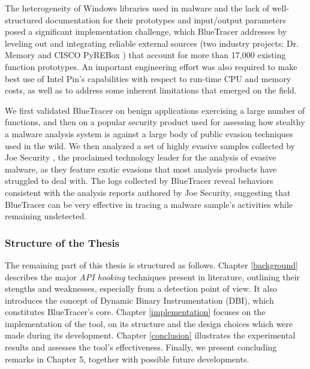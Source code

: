 The heterogeneity of Windows libraries used in malware and the lack of well-structured documentation for their prototypes and input/output parameters posed a significant implementation challenge, which BlueTracer addresses by leveling out and integrating reliable external sources (two industry projects: Dr. Memory \cite{DrMemory} and CISCO PyREBox \cite{Pyrebox}) that account for more than 17,000 existing function prototypes. An important engineering effort was also required to make best use of Intel Pin’s capabilities with respect to run-time CPU and memory costs, as well as to address some inherent limitations that emerged on the field.

We first validated BlueTracer on benign applications exercising a large number of functions, and then on a popular security product used for assessing how stealthy a malware analysis system is against a large body of public evasion techniques used in the wild. We then analyzed a set of highly evasive samples collected by Joe Security \cite{JoeBox}, the proclaimed technology leader for the analysis of evasive malware, as they feature exotic evasions that most analysis products have struggled to deal with. The logs collected by BlueTracer reveal behaviors consistent with the analysis reports authored by Joe Security, suggesting that BlueTracer can be very effective in tracing a malware sample’s activities while remaining undetected. 
\iffalse
I then analyzed a set of highly evasive samples collected by Joe Security, the proclaimed technology leader for the analysis of evasive malware, as they feature exotic evasions that most analysis products have struggled to deal with. The logs collected by BlueTracer reveal behaviors consistent with the analysis reports authored by Joe Security, suggesting that BlueTracer can be very effective in tracing a malware sample's activities while remaining undetected. 
\fi               

\subsubsection{Structure of the Thesis}
The remaining part of this thesis is structured as follows.
Chapter \ref{background} describes the major \textit{API hooking} techniques present in literature, outlining their stengths and weaknesses, especially from a detection point of view. It also introduces the concept of Dynamic Binary Instrumentation (DBI), which constitutes BlueTracer's core.
Chapter \ref{implementation} focuses on the implementation of the tool, on its structure and the design choices which were made during its development.
Chapter \ref{conclusion} illustrates the experimental results and assesses the tool's effectiveness.
Finally, we present concluding remarks in Chapter 5, together with possible future developments.
